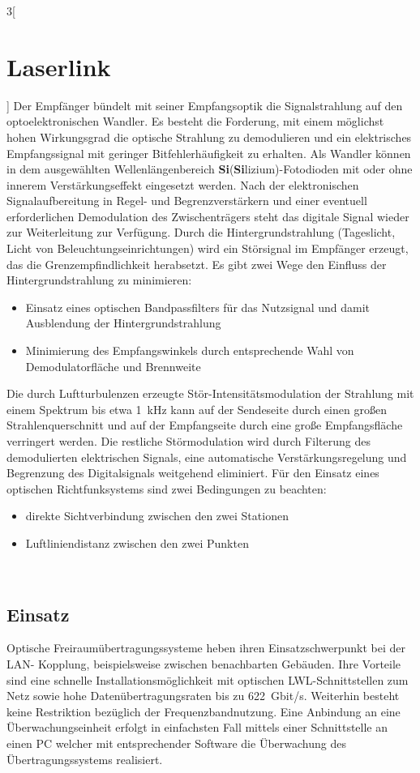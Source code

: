 \begin{multicols}{3}[\section{Laserlink}]
Der Empfänger bündelt mit seiner Empfangsoptik die Signalstrahlung auf den optoelektronischen Wandler. Es besteht die Forderung, mit einem möglichst hohen Wirkungsgrad die optische Strahlung zu demodulieren und ein elektrisches Empfangssignal mit geringer Bitfehlerhäufigkeit zu erhalten. Als Wandler können in dem ausgewählten Wellenlängenbereich \textbf{Si}(\textbf{Si}lizium)-Fotodioden mit oder ohne innerem Verstärkungseffekt eingesetzt werden. Nach der elektronischen Signalaufbereitung in Regel- und Begrenzverstärkern und einer eventuell erforderlichen Demodulation des Zwischenträgers steht das digitale Signal wieder zur Weiterleitung zur Verfügung. 
Durch die Hintergrundstrahlung (Tageslicht, Licht von Beleuchtungseinrichtungen) wird ein Störsignal im Empfänger erzeugt, das die Grenzempfindlichkeit herabsetzt. Es gibt zwei Wege den Einfluss der Hintergrundstrahlung zu minimieren: 
\begin{itemize}
\item Einsatz eines optischen Bandpassfilters für das Nutzsignal und damit Ausblendung der Hintergrundstrahlung
\item Minimierung des Empfangswinkels durch entsprechende Wahl von Demodulatorfläche und Brennweite
\end{itemize}
Die durch Luftturbulenzen erzeugte Stör-Intensitätsmodulation der Strahlung mit einem Spektrum bis etwa \SI{1}{\kilo\hertz} kann auf der Sendeseite durch einen großen Strahlenquerschnitt und auf der Empfangseite durch eine große Empfangsfläche verringert werden. Die restliche Störmodulation wird durch Filterung des demodulierten elektrischen Signals, eine automatische Verstärkungsregelung und Begrenzung des Digitalsignals weitgehend eliminiert. 
Für den Einsatz eines optischen Richtfunksystems sind zwei Bedingungen zu beachten:
\begin{itemize}
\item direkte Sichtverbindung zwischen den zwei Stationen
\item Luftliniendistanz zwischen den zwei Punkten 
\end{itemize}
~\cite{Laserlink.2}

\subsection*{Einsatz}
Optische Freiraumübertragungssysteme heben ihren Einsatzschwerpunkt bei der LAN- Kopplung, beispielsweise zwischen benachbarten Gebäuden. Ihre Vorteile sind eine schnelle Installationsmöglichkeit mit optischen LWL-Schnittstellen zum Netz sowie hohe Datenübertragungsraten bis zu \SI{622}{Gbit/s}. 
Weiterhin besteht keine Restriktion bezüglich der Frequenzbandnutzung. Eine Anbindung an eine Überwachungseinheit erfolgt in einfachsten Fall mittels einer Schnittstelle an einen PC welcher mit entsprechender Software die Überwachung des Übertragungssystems realisiert. 
\end{multicols}
\newpage
